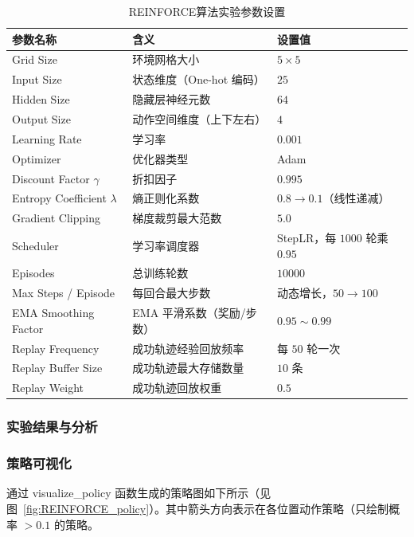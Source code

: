 \begin{table}[htbp]
\centering
\caption{REINFORCE算法实验参数设置}
\label{tab:reinforce-params}
\begin{tabular}{@{}lll@{}}
\toprule
\textbf{参数名称} & \textbf{含义} & \textbf{设置值} \\
\midrule
Grid Size & 环境网格大小 & \( 5 \times 5 \) \\
Input Size & 状态维度（One-hot 编码） & \( 25 \) \\
Hidden Size & 隐藏层神经元数 & \( 64 \) \\
Output Size & 动作空间维度（上下左右） & \( 4 \) \\
Learning Rate & 学习率 & \( 0.001 \) \\
Optimizer & 优化器类型 & Adam \\
Discount Factor \(\gamma\) & 折扣因子 & \( 0.995 \) \\
Entropy Coefficient \(\lambda\) & 熵正则化系数 & \( 0.8 \rightarrow 0.1 \)（线性递减） \\
Gradient Clipping & 梯度裁剪最大范数 & \( 5.0 \) \\
Scheduler & 学习率调度器 & StepLR，每 \( 1000 \) 轮乘 \( 0.95 \) \\
Episodes & 总训练轮数 & \( 10000 \) \\
Max Steps / Episode & 每回合最大步数 & 动态增长，\( 50 \rightarrow 100 \) \\
EMA Smoothing Factor & EMA 平滑系数（奖励/步数） & \( 0.95 \sim 0.99 \) \\
Replay Frequency & 成功轨迹经验回放频率 & 每 \( 50 \) 轮一次 \\
Replay Buffer Size & 成功轨迹最大存储数量 & \( 10 \) 条 \\
Replay Weight & 成功轨迹回放权重 & \( 0.5 \) \\
\bottomrule
\end{tabular}
\end{table}

\subsubsection{实验结果与分析}

\subsubsection{策略可视化}

通过 \textsf{visualize\_policy} 函数生成的策略图如下所示（见图~\ref{fig:REINFORCE_policy}）。其中箭头方向表示在各位置动作策略（只绘制概率 \(> 0.1\) 的策略。


